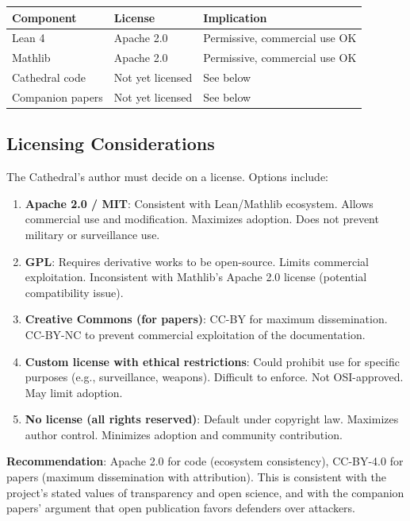 \documentclass[11pt,a4paper]{article}
\begin{document}
\begin{center}
\begin{tabular}{@{}lll@{}}
\toprule
\textbf{Component} & \textbf{License} & \textbf{Implication} \\
\midrule
Lean 4 & Apache 2.0 & Permissive, commercial use OK \\
Mathlib & Apache 2.0 & Permissive, commercial use OK \\
Cathedral code & Not yet licensed & See below \\
Companion papers & Not yet licensed & See below \\
\bottomrule
\end{tabular}
\end{center}

\subsection{Licensing Considerations}

The Cathedral's author must decide on a license. Options include:

\begin{enumerate}
  \item \textbf{Apache 2.0 / MIT}: Consistent with Lean/Mathlib
    ecosystem. Allows commercial use and modification. Maximizes
    adoption. Does not prevent military or surveillance use.

  \item \textbf{GPL}: Requires derivative works to be open-source.
    Limits commercial exploitation. Inconsistent with Mathlib's
    Apache 2.0 license (potential compatibility issue).

  \item \textbf{Creative Commons (for papers)}: CC-BY for maximum
    dissemination. CC-BY-NC to prevent commercial exploitation
    of the documentation.

  \item \textbf{Custom license with ethical restrictions}: Could
    prohibit use for specific purposes (e.g., surveillance,
    weapons). Difficult to enforce. Not OSI-approved. May limit
    adoption.

  \item \textbf{No license (all rights reserved)}: Default under
    copyright law. Maximizes author control. Minimizes adoption
    and community contribution.
\end{enumerate}

\textbf{Recommendation}: Apache 2.0 for code (ecosystem
consistency), CC-BY-4.0 for papers (maximum dissemination with
attribution). This is consistent with the project's stated values
of transparency and open science, and with the companion papers'
argument that open publication favors defenders over attackers.
\end{document}
